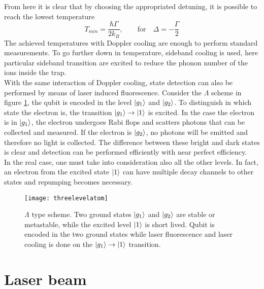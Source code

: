 From here it is clear that by choosing the appropriated detuning, it is possible to reach the lowest temperature
\begin{equation}
T_{min} = \frac{\hbar \Gamma}{2k_{B}}, \qquad \text{for} \quad \Delta = -\frac{\Gamma}{2}
\end{equation}
The achieved temperatures with Doppler cooling are enough to perform standard measurements. To go further down in temperature, sideband cooling is used, here particular sideband transition are excited to reduce the phonon number of the ions inside the trap.\\
With the same interaction of Doppler cooling, state detection can also be performed by means of laser induced fluorescence. Consider the $\Lambda$ scheme in figure \ref{threelevel}, the qubit is encoded in the level $\ket{g_1}$ and $\ket{g_2}$. To distinguish in which state the electron is, the transition $\ket{g_1}\to \ket{1}$ is excited. In the case the electron is in $\ket{g_1}$, the electron undergoes Rabi flops and scatters photons that can be collected and measured. If the electron is $\ket{g_2}$, no photons will be emitted and therefore no light is collected. The difference between these bright and dark states is clear and detection can be performed efficiently with near perfect efficiency.\\
In the real case, one must take into consideration also all the other levels. In fact, an electron from the excited state $\ket{1}$ can have multiple decay channels to other states and repumping becomes necessary.
\begin{figure}
\centering
\texttt{[image: threelevelatom]}
\caption{$\Lambda$ type scheme. Two ground states $\ket{g_1}$ and $\ket{g_2}$ are stable or metastable, while the excited level $\ket{1}$ is short lived. Qubit is encoded in the two ground states while laser fluorescence and laser cooling is done on the $\ket{g_1}\to \ket{1}$ transition.}
\label{threelevel}
\end{figure}
\section{Laser beam}
